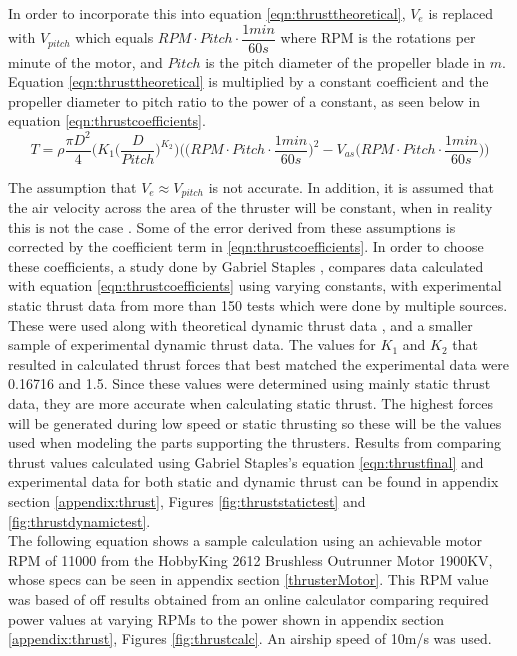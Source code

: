 \documentclass[../main.tex]{subfiles}
\begin{document}
In order to incorporate this into equation \ref{eqn:thrusttheoretical}, $V_{e}$ is replaced with $V_{pitch}$ which equals \linebreak $RPM\cdot Pitch \cdot \dfrac{1min}{60s}$ where RPM is the rotations per minute of the motor, and $Pitch$ is the pitch diameter of the propeller blade in $m$. Equation \ref{eqn:thrusttheoretical} is multiplied by a constant coefficient and the propeller diameter to pitch ratio to the power of a constant, as seen below in equation \ref{eqn:thrustcoefficients}. 
	\begin{equation}
    \label{eqn:thrustcoefficients}
	T = \rho \dfrac{\pi D^2}{4}\Bigg(K_1\Big(\dfrac{D}{Pitch}\Big)^{K_2}\Bigg)\Bigg(\Big(RPM\cdot Pitch \cdot \dfrac{1min}{60s}\Big)^2 - V_{as}\Big(RPM\cdot Pitch \cdot \dfrac{1min}{60s}\Big)\Bigg)
	\end{equation}

The assumption that $V_{e} \approx V_{pitch}$ is not accurate. In addition, it is assumed that the air velocity across the area of the thruster will be constant, when in reality this is not the case \cite{thrusteq}. Some of the error derived from these assumptions is corrected by the coefficient term in \ref{eqn:thrustcoefficients}. In order to choose these coefficients, a study done by Gabriel Staples \cite{thrusteq} \cite{thrustaccuracy}, compares data calculated with equation \ref{eqn:thrustcoefficients} using varying constants, with experimental static thrust data from more than 150 tests which were done by multiple sources. These were used along with theoretical dynamic thrust data \cite{thrustlegit}, and a smaller sample of experimental dynamic thrust data. The values for $K_1$ and $K_2$ that resulted in calculated thrust forces that best matched the experimental data were 0.16716 and 1.5. Since these values were determined using mainly static thrust data, they are more accurate when calculating static thrust. The highest forces will be generated during low speed or static thrusting so these will be the values used when modeling the parts supporting the thrusters. Results from comparing thrust values calculated using Gabriel Staples's equation \ref{eqn:thrustfinal} and experimental data for both static and dynamic thrust can be found in appendix section \ref{appendix:thrust}, Figures \ref{fig:thruststatictest} and \ref{fig:thrustdynamictest}. \\

The following equation shows a sample calculation using an achievable motor RPM of 11000 from the HobbyKing 2612 Brushless Outrunner Motor 1900KV, whose specs can be seen in appendix section \ref{thrusterMotor}. This RPM value was based of off results obtained from an online calculator comparing required power values at varying RPMs to the power shown in appendix section \ref{appendix:thrust}, Figures \ref{fig:thrustcalc}. An airship speed of 10m/s was used. 
\end{document}
